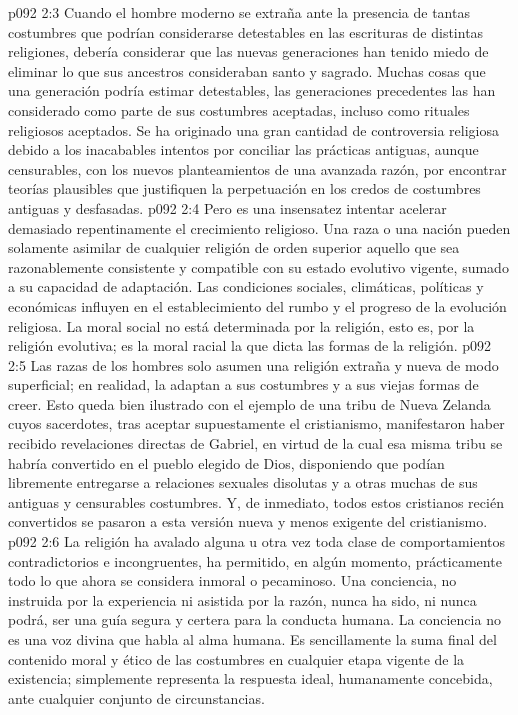\vs p092 2:3 Cuando el hombre moderno se extraña ante la presencia de tantas costumbres que podrían considerarse detestables en las escrituras de distintas religiones, debería considerar que las nuevas generaciones han tenido miedo de eliminar lo que sus ancestros consideraban santo y sagrado. Muchas cosas que una generación podría estimar detestables, las generaciones precedentes las han considerado como parte de sus costumbres aceptadas, incluso como rituales religiosos aceptados. Se ha originado una gran cantidad de controversia religiosa debido a los inacabables intentos por conciliar las prácticas antiguas, aunque censurables, con los nuevos planteamientos de una avanzada razón, por encontrar teorías plausibles que justifiquen la perpetuación en los credos de costumbres antiguas y desfasadas.
\vs p092 2:4 Pero es una insensatez intentar acelerar demasiado repentinamente el crecimiento religioso. Una raza o una nación pueden solamente asimilar de cualquier religión de orden superior aquello que sea razonablemente consistente y compatible con su estado evolutivo vigente, sumado a su capacidad de adaptación. Las condiciones sociales, climáticas, políticas y económicas influyen en el establecimiento del rumbo y el progreso de la evolución religiosa. La moral social no está determinada por la religión, esto es, por la religión evolutiva; es la moral racial la que dicta las formas de la religión.
\vs p092 2:5 Las razas de los hombres solo asumen una religión extraña y nueva de modo superficial; en realidad, la adaptan a sus costumbres y a sus viejas formas de creer. Esto queda bien ilustrado con el ejemplo de una tribu de Nueva Zelanda cuyos sacerdotes, tras aceptar supuestamente el cristianismo, manifestaron haber recibido revelaciones directas de Gabriel, en virtud de la cual esa misma tribu se habría convertido en el pueblo elegido de Dios, disponiendo que podían libremente entregarse a relaciones sexuales disolutas y a otras muchas de sus antiguas y censurables costumbres. Y, de inmediato, todos estos cristianos recién convertidos se pasaron a esta versión nueva y menos exigente del cristianismo.
\vs p092 2:6 La religión ha avalado alguna u otra vez toda clase de comportamientos contradictorios e incongruentes, ha permitido, en algún momento, prácticamente todo lo que ahora se considera inmoral o pecaminoso. Una conciencia, no instruida por la experiencia ni asistida por la razón, nunca ha sido, ni nunca podrá, ser una guía segura y certera para la conducta humana. La conciencia no es una voz divina que habla al alma humana. Es sencillamente la suma final del contenido moral y ético de las costumbres en cualquier etapa vigente de la existencia; simplemente representa la respuesta ideal, humanamente concebida, ante cualquier conjunto de circunstancias.
